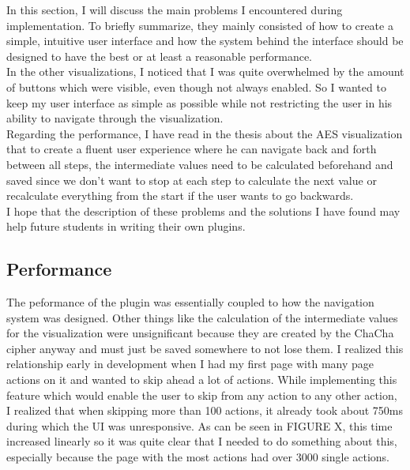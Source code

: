 In this section, I will discuss the main problems I encountered during implementation. To briefly summarize, they mainly consisted of how to create a simple, intuitive user interface and how the system behind the interface should be designed to have the best or at least a reasonable performance. \\ In the other visualizations, I noticed that I was quite overwhelmed by the amount of buttons which were visible, even though not always enabled. So I wanted to keep my user interface as simple as possible while not restricting the user in his ability to navigate through the visualization. \\ Regarding the performance, I have read in the thesis about the AES visualization that to create a fluent user experience where he can navigate back and forth between all steps, the intermediate values need to be calculated beforehand and saved since we don't want to stop at each step to calculate the next value or recalculate everything from the start if the user wants to go backwards.\\
I hope that the description of these problems and the solutions I have found may help future students in writing their own plugins.

\subsection{Performance}

The peformance of the plugin was essentially coupled to how the navigation system was designed. Other things like the calculation of the intermediate values for the visualization were unsignificant because they are created by the ChaCha cipher anyway and must just be saved somewhere to not lose them. I realized this relationship early in development when I had my first page with many page actions on it and wanted to skip ahead a lot of actions. While implementing this feature which would enable the user to skip from any action to any other action, I realized that when skipping more than 100 actions, it already took about 750ms during which the UI was unresponsive. As can be seen in FIGURE X, this time increased linearly so it was quite clear that I needed to do something about this, especially because the page with the most actions had over 3000 single actions.

\par

